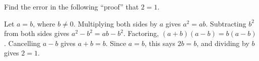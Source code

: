 Find the error in the following ``proof'' that $2=1$.

Let $a=b$, where $b\ne0$. Multiplying both sides by $a$ gives $a^2=ab$. Subtracting $b^2$ from both sides gives $a^2-b^2=ab-b^2$. Factoring, $(a+b)(a-b)=b(a-b)$. Cancelling $a-b$ gives $a+b=b$. Since $a=b$, this says $2b=b$, and dividing by $b$ gives $2=1$.
